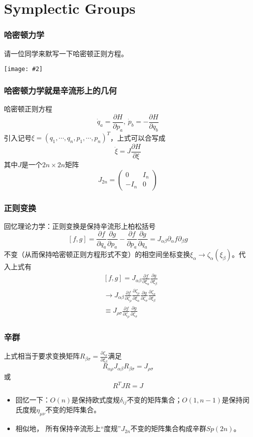 \documentclass[CJK]{beamer}
\def\secpage#1#2{\begin{frame}\bch\bcenter{\bf \Huge #1} \skipline \tbox{#2}\ecenter\ech\end{frame}}
\newcommand{\cpic}[2]{
\begin{center}
\texttt{[image: \#2]}
\end{center}
}
\begin{document}
\section{Symplectic Groups}
\secpage{辛群}{正则变换是保辛变换}

\begin{frame}
\frametitle{\bch 哈密顿力学 \ech}
\bch
请一位同学来默写一下哈密顿正则方程。
\cpic{0.2}{eat}

\ech
\end{frame}

\begin{frame}
\frametitle{\bch 哈密顿力学就是辛流形上的几何 \ech}
\bch
哈密顿正则方程
$$
\dot{q}_a = \frac{\partial H}{\partial p_a} ,\ \dot{p}_b = - \frac{\partial H}{\partial q_b}
$$
引入记号$\xi = (q_1,\cdots,q_n,p_1,\cdots,p_n)^T$，上式可以合写成
$$
\dot{\xi} = J\frac{\partial H}{\partial \xi}
$$
其中$J$是一个$2n\times 2n$矩阵
{\color{blue}
$$
J_{2n} = \begin{pmatrix} 0 & I_n \\ -I_n & 0 \end{pmatrix}
$$
}
\ech
\end{frame}

\begin{frame}
\frametitle{\bch 正则变换 \ech}
\bch
回忆理论力学：正则变换是保持辛流形上柏松括号
$$
[f,g] = \frac{\partial f}{\partial q_a} \frac{\partial g}{\partial p_a} - \frac{\partial f}{\partial p_a} \frac{\partial g}{\partial q_a} = J_{\alpha \beta} \partial_\alpha f \partial_\beta g
$$
不变（从而保持哈密顿正则方程形式不变）的相空间坐标变换$\xi_\alpha \to \zeta_\alpha (\xi_\beta)$。代入上式有
\begin{equation*}
\begin{aligned}
&[ f, g ] = J_{\alpha \beta} \frac{\partial f}{\partial \xi_\alpha} \frac{\partial g}{\partial \xi_\beta} \\
&\to J_{\alpha \beta} \frac{\partial f}{\partial \zeta_\rho} \frac{\partial \zeta_\rho}{\partial \xi_\alpha} \frac{\partial g}{\partial \zeta_\sigma} \frac{\partial \zeta_\sigma}{\partial \xi_\beta} \\
&\equiv J_{\rho \sigma} \frac{\partial f}{\partial \zeta_\rho} \frac{\partial g}{\partial \zeta_\sigma}
\end{aligned}
\end{equation*}
\ech
\end{frame}

\begin{frame}
\frametitle{\bch 辛群 \ech}
\bch
上式相当于要求变换矩阵$R_{\beta \sigma} = \frac{\partial \zeta_\sigma}{\partial \xi_\beta}$满足
$$
R_{\alpha \rho} J_{\alpha \beta} R_{\beta \sigma} = J_{\rho \sigma}
$$
或
$$
R^T J R = J
$$
\begin{itemize}
\item 回忆一下：$O(n)$是保持欧式度规$\delta_{ij}$不变的矩阵集合；$O(1,n-1)$是保持闵氏度规$\eta_{\mu \nu}$不变的矩阵集合。
\item 相似地，{\color{blue} 所有保持辛流形上“度规”$J_{2n}$不变的矩阵集合构成辛群$Sp(2n)$}。
\end{itemize}

\ech
\end{frame}
\end{document}
